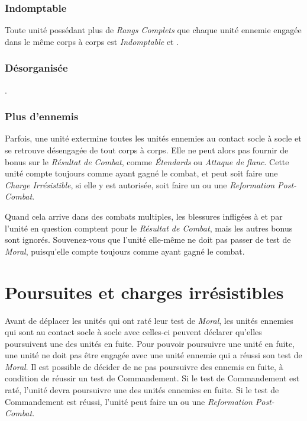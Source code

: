 \subsubsection*{Indomptable}

Toute unité possédant plus de \emph{Rangs Complets} que chaque unité ennemie engagée dans le même corps à corps est \emph{Indomptable} et .

\subsubsection*{Désorganisée}

.

\subsubsection*{Plus d'ennemis}
\label{cac/plus_ennemis}
Parfois, une unité extermine toutes les unités ennemies au contact socle à socle et se retrouve désengagée de tout corps à corps. Elle ne peut alors pas fournir de bonus sur le \emph{Résultat de Combat}, comme \emph{Étendards} ou \emph{Attaque de flanc}. Cette unité compte toujours comme ayant gagné le combat, et peut soit faire une \emph{Charge Irrésistible}, si elle y est autorisée, soit faire un  ou une \emph{Reformation Post-Combat}.

Quand cela arrive dans des combats multiples, les blessures infligées à et par l'unité en question comptent pour le \emph{Résultat de Combat}, mais les autres bonus sont ignorés. Souvenez-vous que l'unité elle-même ne doit pas passer de test de \emph{Moral}, puisqu'elle compte toujours comme ayant gagné le combat.

\section{Poursuites et charges irrésistibles}

Avant de déplacer les unités qui ont raté leur test de \emph{Moral}, les unités ennemies qui sont au contact socle à socle avec celles-ci peuvent déclarer qu'elles poursuivent une des unités en fuite. Pour pouvoir poursuivre une unité en fuite, une unité ne doit pas être engagée avec une unité ennemie qui a réussi son test de \emph{Moral}. Il est possible de décider de ne pas poursuivre des ennemis en fuite, à condition de réussir un test de Commandement. Si le test de Commandement est raté, l'unité devra poursuivre une des unités ennemies en fuite. Si le test de Commandement est réussi, l'unité peut faire un  ou une \emph{Reformation Post-Combat}. 

